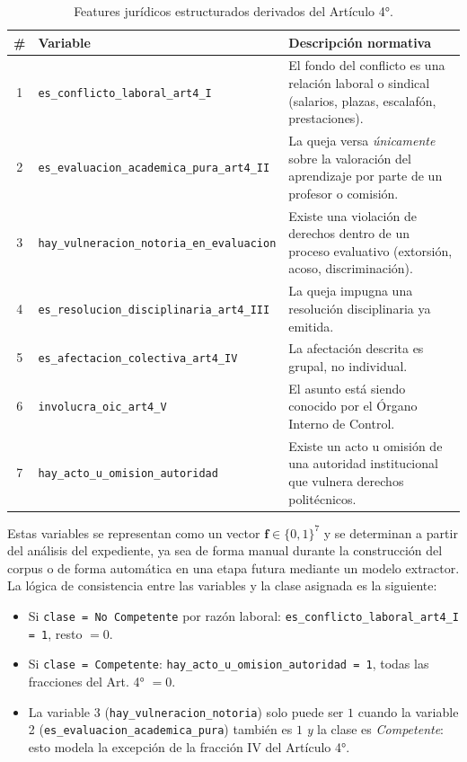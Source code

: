 \begin{table}[H]
\centering
\caption{Features jurídicos estructurados derivados del Artículo 4°.}
\label{tab:features_mt}
\begin{tabularx}{\textwidth}{clX}
\toprule
\textbf{\#} & \textbf{Variable} & \textbf{Descripción normativa} \\
\midrule
1 & \texttt{es\_conflicto\_laboral\_art4\_I} &
    El fondo del conflicto es una relación laboral o sindical
    (salarios, plazas, escalafón, prestaciones). \\
2 & \texttt{es\_evaluacion\_academica\_pura\_art4\_II} &
    La queja versa \emph{únicamente} sobre la valoración del
    aprendizaje por parte de un profesor o comisión. \\
3 & \texttt{hay\_vulneracion\_notoria\_en\_evaluacion} &
    Existe una violación de derechos dentro de un proceso
    evaluativo (extorsión, acoso, discriminación). \\
4 & \texttt{es\_resolucion\_disciplinaria\_art4\_III} &
    La queja impugna una resolución disciplinaria ya emitida. \\
5 & \texttt{es\_afectacion\_colectiva\_art4\_IV} &
    La afectación descrita es grupal, no individual. \\
6 & \texttt{involucra\_oic\_art4\_V} &
    El asunto está siendo conocido por el Órgano Interno de
    Control. \\
7 & \texttt{hay\_acto\_u\_omision\_autoridad} &
    Existe un acto u omisión de una autoridad institucional
    que vulnera derechos politécnicos. \\
\bottomrule
\end{tabularx}
\end{table}

Estas variables se representan como un vector $\mathbf{f} \in \{0, 1\}^7$ y
se determinan a partir del análisis del expediente, ya sea de forma manual
durante la construcción del corpus o de forma automática en una etapa futura
mediante un modelo extractor. La lógica de consistencia entre las variables y
la clase asignada es la siguiente:

\begin{itemize}
  \item Si \texttt{clase = No Competente} por razón laboral:
        \texttt{es\_conflicto\_laboral\_art4\_I = 1}, resto $= 0$.
  \item Si \texttt{clase = Competente}: \texttt{hay\_acto\_u\_omision\_autoridad = 1},
        todas las fracciones del Art. 4° $= 0$.
  \item La variable 3 (\texttt{hay\_vulneracion\_notoria}) solo puede ser $1$
        cuando la variable 2 (\texttt{es\_evaluacion\_academica\_pura}) también
        es $1$ \emph{y} la clase es \textit{Competente}: esto modela la excepción
        de la fracción IV del Artículo 4°.
\end{itemize}

